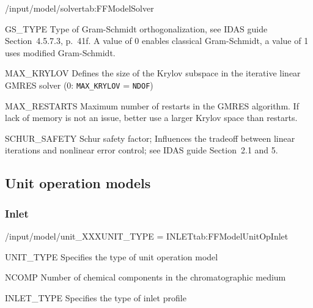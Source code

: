 \begin{groupscope}{/input/model/solver}{tab:FFModelSolver}
  \begin{dataset}[type=int,range={$\{0, 1\}$},length=1]{GS\_TYPE}
    Type of Gram-Schmidt orthogonalization, see IDAS guide Section~4.5.7.3, p.~41f.
    A value of $0$ enables classical Gram-Schmidt, a value of 1 uses modified Gram-Schmidt.
  \end{dataset}
  \begin{dataset}[type=int,range={$\{0, \dots, \texttt{NDOF}\}$},length=1]{MAX\_KRYLOV}
    Defines the size of the Krylov subspace in the iterative linear GMRES solver (0: \texttt{MAX\_KRYLOV} = \texttt{NDOF})
  \end{dataset}
  \begin{dataset}[type=int,range={$\geq 0$},length=1]{MAX\_RESTARTS}
    Maximum number of restarts in the GMRES algorithm. If lack of memory is not an issue, better use a larger Krylov space than restarts.
  \end{dataset}
  \begin{dataset}[type=double,range={$\geq 0$},length=1]{SCHUR\_SAFETY}
    Schur safety factor; Influences the tradeoff between linear iterations and nonlinear error control; see IDAS guide Section~2.1 and 5.
  \end{dataset}
\end{groupscope}

\subsection{Unit operation models}\label{sec:FFModelUnitOp}

\subsubsection{Inlet}

\begin{condsubgroup}{/input/model/unit\_XXX}{UNIT\_TYPE = INLET}{tab:FFModelUnitOpInlet}
  \begin{dataset}[type=string,range={\texttt{INLET}},length=1]{UNIT\_TYPE}
    Specifies the type of unit operation model
  \end{dataset}
  \begin{dataset}[type=int,range={$\geq 1$},length=1]{NCOMP}
    Number of chemical components in the chromatographic medium
  \end{dataset}
  \begin{dataset}[type=string,range={\texttt{PIECEWISE\_CUBIC\_POLY}},length=1]{INLET\_TYPE}
    Specifies the type of inlet profile
  \end{dataset}
\end{condsubgroup}

